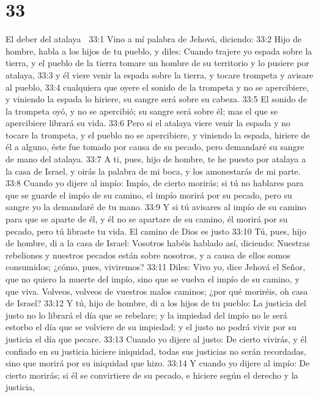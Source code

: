 \chapter{33}

El deber del atalaya   

33:1 Vino a mí palabra de Jehová, diciendo:  
33:2 Hijo de hombre, habla a los hijos de tu pueblo, y diles: Cuando trajere yo espada sobre la tierra, y el pueblo de la tierra tomare un hombre de su territorio y lo pusiere por atalaya,  
33:3 y él viere venir la espada sobre la tierra, y tocare trompeta y avisare al pueblo,  
33:4 cualquiera que oyere el sonido de la trompeta y no se apercibiere, y viniendo la espada lo hiriere, su sangre será sobre su cabeza.  
33:5 El sonido de la trompeta oyó, y no se apercibió; su sangre será sobre él; mas el que se apercibiere librará su vida.  
33:6 Pero si el atalaya viere venir la espada y no tocare la trompeta, y el pueblo no se apercibiere, y viniendo la espada, hiriere de él a alguno, éste fue tomado por causa de su pecado, pero demandaré su sangre de mano del atalaya.  
33:7 A ti, pues, hijo de hombre, te he puesto por atalaya a la casa de Israel, y oirás la palabra de mi boca, y los amonestarás de mi parte.  
33:8 Cuando yo dijere al impío: Impío, de cierto morirás; si tú no hablares para que se guarde el impío de su camino, el impío morirá por su pecado, pero su sangre yo la demandaré de tu mano.  
33:9 Y si tú avisares al impío de su camino para que se aparte de él, y él no se apartare de su camino, él morirá por su pecado, pero tú libraste tu vida.  
El camino de Dios es justo  
33:10 Tú, pues, hijo de hombre, di a la casa de Israel: Vosotros habéis hablado así, diciendo: Nuestras rebeliones y nuestros pecados están sobre nosotros, y a causa de ellos somos consumidos; ¿cómo, pues, viviremos?  
33:11 Diles: Vivo yo, dice Jehová el Señor, que no quiero la muerte del impío, sino que se vuelva el impío de su camino, y que viva. Volveos, volveos de vuestros malos caminos; ¿por qué moriréis, oh casa de Israel?  
33:12 Y tú, hijo de hombre, di a los hijos de tu pueblo: La justicia del justo no lo librará el día que se rebelare; y la impiedad del impío no le será estorbo el día que se volviere de su impiedad; y el justo no podrá vivir por su justicia el día que pecare.  
33:13 Cuando yo dijere al justo: De cierto vivirás, y él confiado en su justicia hiciere iniquidad, todas sus justicias no serán recordadas, sino que morirá por su iniquidad que hizo.  
33:14 Y cuando yo dijere al impío: De cierto morirás; si él se convirtiere de su pecado, e hiciere según el derecho y la justicia,  
